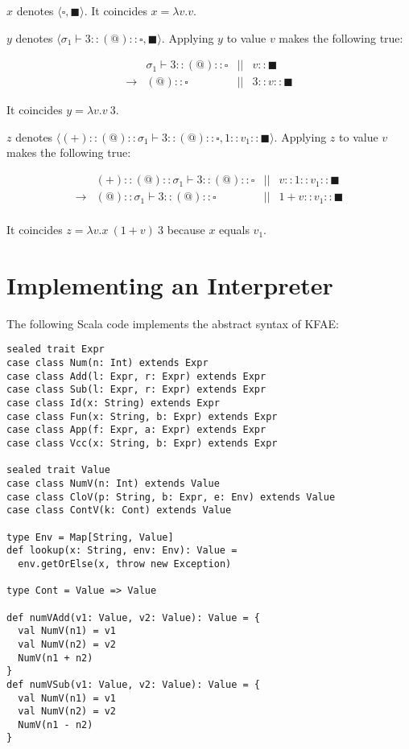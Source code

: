 $x$ denotes $\langle\square,\blacksquare\rangle$. It coincides $x=\lambda v.v$.

$y$ denotes $\langle\sigma_1\vdash3::(@)::\square,\blacksquare\rangle$. Applying
$y$ to value $v$ makes the following true:

\[\begin{array}{lrcr}
& \sigma_1\vdash3::(@)::\square &||&  v::\blacksquare \\
\rightarrow & (@)::\square &||&  3::v::\blacksquare
\end{array}\]

It coincides $y=\lambda v.v\ 3$.

$z$ denotes
$\langle(+)::(@)::\sigma_1\vdash3::(@)::\square,1::v_1::\blacksquare\rangle$.
Applying $z$ to value $v$ makes the following true:

\[\begin{array}{lrcr}
& (+)::(@)::\sigma_1\vdash3::(@)::\square &||& v::1::v_1::\blacksquare\\
\rightarrow & (@)::\sigma_1\vdash3::(@)::\square &||& 1+v::v_1::\blacksquare\\
\end{array}\]

It coincides $z=\lambda v.x\ (1+v)\ 3$ because $x$ equals $v_1$.

\section{Implementing an Interpreter}

The following Scala code implements the abstract syntax of KFAE:

\begin{verbatim}
sealed trait Expr
case class Num(n: Int) extends Expr
case class Add(l: Expr, r: Expr) extends Expr
case class Sub(l: Expr, r: Expr) extends Expr
case class Id(x: String) extends Expr
case class Fun(x: String, b: Expr) extends Expr
case class App(f: Expr, a: Expr) extends Expr
case class Vcc(x: String, b: Expr) extends Expr

sealed trait Value
case class NumV(n: Int) extends Value
case class CloV(p: String, b: Expr, e: Env) extends Value
case class ContV(k: Cont) extends Value

type Env = Map[String, Value]
def lookup(x: String, env: Env): Value =
  env.getOrElse(x, throw new Exception)

type Cont = Value => Value

def numVAdd(v1: Value, v2: Value): Value = {
  val NumV(n1) = v1
  val NumV(n2) = v2
  NumV(n1 + n2)
}
def numVSub(v1: Value, v2: Value): Value = {
  val NumV(n1) = v1
  val NumV(n2) = v2
  NumV(n1 - n2)
}
\end{verbatim}

